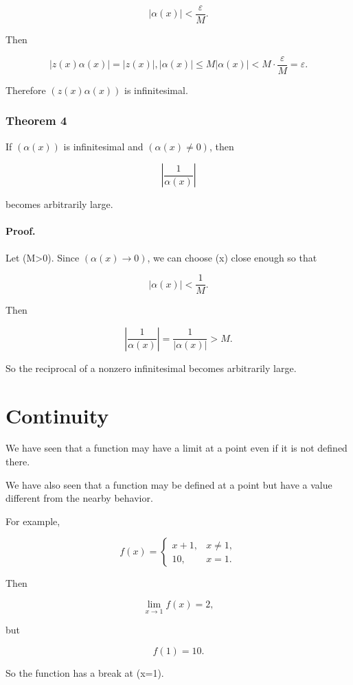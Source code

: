 \[
|\alpha(x)|<\frac{\varepsilon}{M}.
\]

Then

\[
|z(x)\alpha(x)| = |z(x)|,|\alpha(x)| \leq M|\alpha(x)| < M\cdot \frac{\varepsilon}{M} = \varepsilon.
\]

Therefore $(z(x)\alpha(x))$ is infinitesimal.

\subsubsection*{Theorem 4}

If $(\alpha(x))$ is infinitesimal and $(\alpha(x)\neq 0)$, then

\[
\left|\frac{1}{\alpha(x)}\right|
\]

becomes arbitrarily large.

\paragraph{Proof.}

Let (M>0). Since $(\alpha(x)\to 0)$, we can choose (x) close enough so that

\[
|\alpha(x)|<\frac{1}{M}.
\]

Then

\[
\left|\frac{1}{\alpha(x)}\right| = \frac{1}{|\alpha(x)|} > M.
\]

So the reciprocal of a nonzero infinitesimal becomes arbitrarily large.

\section{Continuity}

We have seen that a function may have a limit at a point even if it is not defined there.

We have also seen that a function may be defined at a point but have a value different from the nearby behavior.

For example,

\[
f(x)=
\begin{cases}
x+1, & x\neq 1,\\
10, & x=1.
\end{cases}
\]

Then

\[
\lim_{x\to 1}f(x)=2,
\]

but

\[
f(1)=10.
\]

So the function has a break at (x=1).

